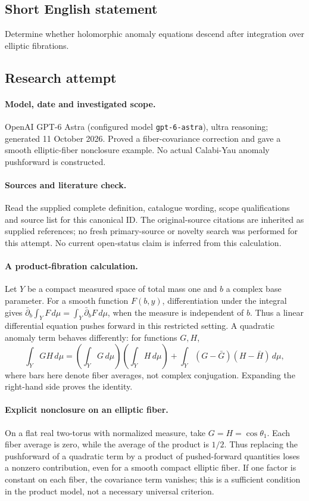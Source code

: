 \documentclass[11pt]{article}
\begin{document}
\subsection{Short English statement}
Determine whether holomorphic anomaly equations descend after integration over elliptic fibrations.
\subsection{Research attempt}
\paragraph{Model, date and investigated scope.}
OpenAI GPT-6 Astra (configured model \texttt{gpt-6-astra}), ultra reasoning; generated 11 October 2026. Proved a fiber-covariance correction and gave a smooth elliptic-fiber nonclosure example. No actual Calabi-Yau anomaly pushforward is constructed.

\paragraph{Sources and literature check.}
Read the supplied complete definition, catalogue wording, scope qualifications and source list for this canonical ID. The original-source citations are inherited as supplied references; no fresh primary-source or novelty search was performed for this attempt. No current open-status claim is inferred from this calculation.

\paragraph{A product-fibration calculation.}Let \(Y\) be a compact measured space of total mass one and \(b\) a complex base parameter. For a smooth function \(F(b,y)\), differentiation under the integral gives \(\bar\partial_b\int_YF\,d\mu=\int_Y\bar\partial_bF\,d\mu\), when the measure is independent of \(b\). Thus a linear differential equation pushes forward in this restricted setting. A quadratic anomaly term behaves differently: for functions \(G,H\),
\[\int_YGH\,d\mu=\left(\int_YG\,d\mu\right)\left(\int_YH\,d\mu\right)+\int_Y(G-\bar G)(H-\bar H)\,d\mu,
\]
where bars here denote fiber averages, not complex conjugation. Expanding the right-hand side proves the identity.
\paragraph{Explicit nonclosure on an elliptic fiber.}On a flat real two-torus with normalized measure, take \(G=H=\cos\theta_1\). Each fiber average is zero, while the average of the product is \(1/2\). Thus replacing the pushforward of a quadratic term by a product of pushed-forward quantities loses a nonzero contribution, even for a smooth compact elliptic fiber. If one factor is constant on each fiber, the covariance term vanishes; this is a sufficient condition in the product model, not a necessary universal criterion.
\end{document}
